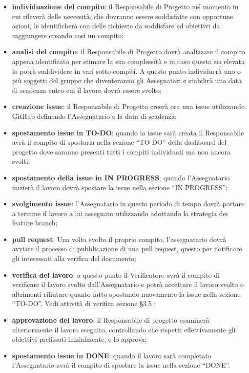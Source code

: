             \begin{itemize}
                \item\textbf{individuazione del compito}: il Responsabile di Progetto nel momento in cui rileverà delle necessità, che dovranno essere soddisfatte con opportune azioni, le identificherà con delle richieste da soddisfare ed obiettivi da raggiungere creando così un compito;
                \item\textbf{analisi del compito}: il Responsabile di Progetto dovrà analizzare il compito appena identificato per stimare la sua complessità e in caso questa sia elevata lo potrà suddividere in vari sotto-compiti. A questo punto individuerà uno o più soggetti del gruppo che diventeranno gli Assegnatari e stabilirà una data di scadenza entro cui il lavoro dovrà essere svolto;
                \item\textbf{creazione issue}: il Responsabile di Progetto creerà ora una issue utilizzando GitHub definendo l’Assegnatario e la data di scadenza;
                \item\textbf{spostamento issue in TO-DO}: quando la issue sarà creata il Responsabile avrà il compito di spostarla nella sezione “TO-DO” della dashboard del progetto dove saranno presenti tutti i compiti individuati ma non ancora svolti; 
                \item\textbf{spostamento della issue in IN PROGRESS}: quando l’Assegnatario inizierà il lavoro dovrà spostare la issue nella sezione “IN PROGRESS”;
                \item\textbf{svolgimento issue}: l’Assegnatario in questo periodo di tempo dovrà portare a termine il lavoro a lui assegnato utilizzando adottando la strategia dei feature branch;
                \item\textbf{pull request}: Una volta svolto il proprio compito, l'assegnatario dovrà avviare il processo di pubblicazione di una pull request, questo per notificare gli interessati alla verifica del documento;
                \item\textbf{verifica del lavoro}: a questo punto il Verificatore avrà il compito di verificare il lavoro svolto dall’Assegnatario e potrà accettare il lavoro svolto o altrimenti rifiutare quanto fatto spostando nuovamente la issue nella sezione “TO-DO”. Vedi attività di verifica sezione §3.5 ;
                \item\textbf{approvazione del lavoro}: il Responsabile di progetto esaminerà ulteriormente il lavoro eseguito, controllando che rispetti effettivamente gli obiettivi prefissati inizialmente, e lo approva;
                \item\textbf{spostamento issue in DONE}: quando il lavoro sarà completato l’Assegnatario avrà il compito di spostare la issue nella sezione “DONE”.
            \end{itemize}

